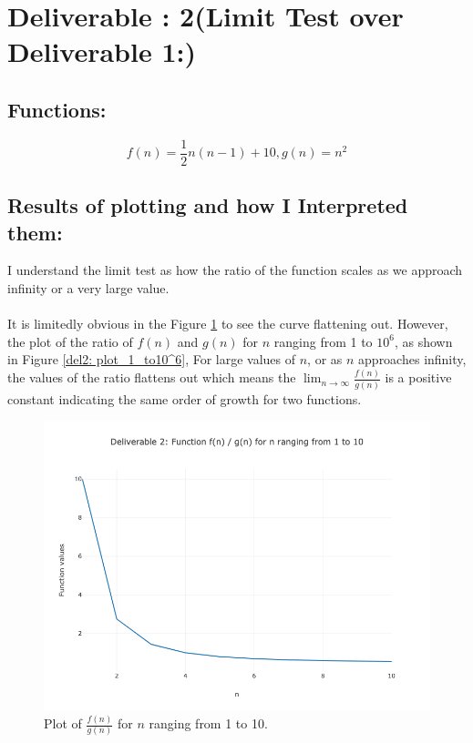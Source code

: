 \documentclass{article}
\begin{document}
\section{Deliverable : 2(Limit Test over Deliverable 1:)}
\subsection{Functions: }
\[
    f(n) = \frac{1}{2}n(n-1) + 10, g(n) = n^2
\]

\subsection{Results of plotting and how I Interpreted them: }

I understand the limit test as how the ratio of the function scales as we approach infinity or a very large value.

\paragraph{} It is limitedly obvious in the Figure \ref{del2: plot_1_to_10} to see the curve flattening out. However, the plot of the ratio of \(f(n)\) and \(g(n)\) for \(n\) ranging from 1 to \(10^6\), as shown in Figure \ref{del2: plot_1_to10^6},
For large values of \(n\), or as \(n\) approaches infinity, the values of the ratio flattens out which means the \(\lim_{n\to \infty}   \frac{f(n)}{g(n)}\) is a positive constant indicating the same order of growth for two functions. 

\begin{figure}[H]
    \centering
    \includegraphics[width=\textwidth]{Deliverable 2: plot_1_to_10.png}
    \caption{Plot of \(\frac{f(n)}{g(n)}\) for $n$ ranging from 1 to 10.}
    \label{del2: plot_1_to_10}
\end{figure}
\end{document}
